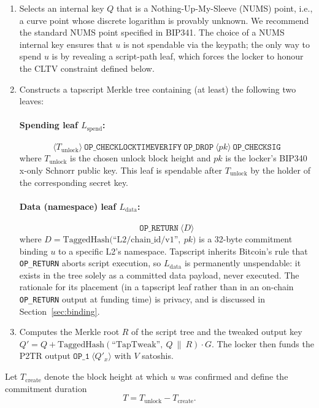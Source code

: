 \documentclass[11pt,a4paper]{article}
\begin{document}
\begin{enumerate}[leftmargin=*]
  \item Selects an internal key $Q$ that is a Nothing-Up-My-Sleeve (NUMS) point, i.e., a curve point whose discrete logarithm is provably unknown. We recommend the standard NUMS point specified in BIP341. The choice of a NUMS internal key ensures that $u$ is not spendable via the keypath; the only way to spend $u$ is by revealing a script-path leaf, which forces the locker to honour the CLTV constraint defined below.

  \item Constructs a tapscript Merkle tree containing (at least) the following two leaves:

  \paragraph{Spending leaf $L_{\mathrm{spend}}$:}
  \[
  \langle T_{\mathrm{unlock}}\rangle\ \texttt{OP\_CHECKLOCKTIMEVERIFY}\ \texttt{OP\_DROP}\ \langle pk\rangle\ \texttt{OP\_CHECKSIG}
  \]
  where $T_{\mathrm{unlock}}$ is the chosen unlock block height and $pk$ is the locker's BIP340 x-only Schnorr public key. This leaf is spendable after $T_{\mathrm{unlock}}$ by the holder of the corresponding secret key.

  \paragraph{Data (namespace) leaf $L_{\mathrm{data}}$:}
  \[
  \texttt{OP\_RETURN}\ \langle D\rangle
  \]
  where $D = \mathrm{TaggedHash}\big(\text{``L2/chain\_id/v1''},\ pk\big)$ is a 32-byte commitment binding $u$ to a specific L2's namespace. Tapscript inherits Bitcoin's rule that \texttt{OP\_RETURN} aborts script execution, so $L_{\mathrm{data}}$ is permanently unspendable: it exists in the tree solely as a committed data payload, never executed. The rationale for its placement (in a tapscript leaf rather than in an on-chain \texttt{OP\_RETURN} output at funding time) is privacy, and is discussed in Section~\ref{sec:binding}.

  \item Computes the Merkle root $R$ of the script tree and the tweaked output key $Q' = Q + \mathrm{TaggedHash}(\text{``TapTweak''},\ Q\ \|\ R) \cdot G$. The locker then funds the P2TR output $\texttt{OP\_1}\ \langle Q'_x\rangle$ with $V$ satoshis.
\end{enumerate}

Let $T_{\mathrm{create}}$ denote the block height at which $u$ was confirmed and define the commitment duration
\[
T = T_{\mathrm{unlock}} - T_{\mathrm{create}}.
\]
\end{document}

